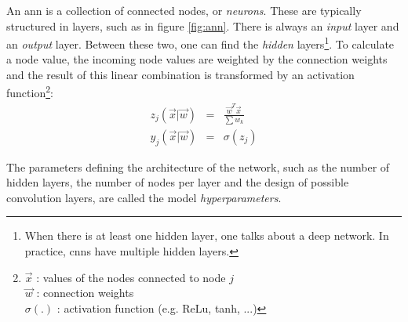\begin{SCfigure}[][h!]
    \centering
    
    \caption{
        Concept of an Artificial (feed-forward) Neural Network. 
        The illustrated network has 4 layers: the input layer, two hidden layers and the output layer.
        The hidden layers first perform a feature extraction transformation on the input data.
        Based on these features, the output layer can generate the model result.
        This simple network illustrates different characteristics of neural networks: 
        First, this concept is flexible.
        Architectures with more than two hidden layers are common. 
        The number of neurons in the hidden layers is another degree of flexibility. 
        Second, a neural network has a high number of parameters. This small network consists of $n\times m + m \times t + t \times k$ weights $w$ and the activation functions in each layer.
        The concept of a \acrfull{cnn} is to reduce the number of weights in specific layers by imposing these to represent a single convolution filter.
        \label{fig:ann}
        }
\end{SCfigure}

\par{
    An \acrshort{ann} is a collection of connected nodes, or \textit{neurons}. 
    These are typically structured in layers, such as in figure \ref{fig:ann}. 
    There is always an \textit{input} layer and an \textit{output} layer. Between these two, one can find the \textit{hidden} layers\footnote{When there is at least one hidden layer, one talks about a deep network. In practice, \acrshort{cnn}s have multiple hidden layers.}.
    To calculate a node value, the incoming node values are weighted by the connection weights and the result of this linear combination is transformed by an activation function\footnote{
        $\vec{x}$ : values of the nodes connected to node $j$\\
        $\vec{w}$ : connection weights\\
        $\sigma(.)$ : activation function (e.g. ReLu, tanh, ...)
    }:
    \begin{eqnarray}
        z_j(\vec{x} | \vec{w}) &=& \frac{\vec{w}^T\vec{x}}{\sum w_k} \\
        y_j(\vec{x} | \vec{w}) &=& \sigma(z_j)
    \end{eqnarray}
}
\par{
    The parameters defining the architecture of the network, such as the number of hidden layers, the number of nodes per layer and the design of possible convolution layers, are called the model \textit{hyperparameters}.
}


